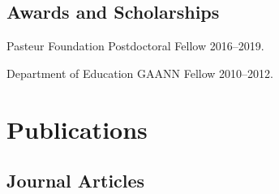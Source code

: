 \documentclass[letterpaper]{article}
\renewenvironment{itemize}{
  \begin{list}{}{
    \setlength{\leftmargin}{1.5em}
  }
}{
  \end{list}
}
\begin{document}
\subsection*{Awards and Scholarships}

\begin{itemize}
 \item Pasteur Foundation Postdoctoral Fellow \hfill 2016--2019.
 \item Department of Education GAANN Fellow \hfill 2010--2012.
\end{itemize}


\section*{Publications}

\subsection*{Journal Articles}



\end{document}
